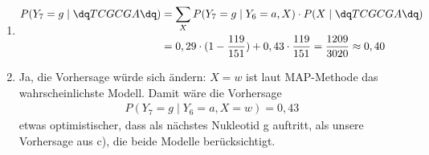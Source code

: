 \documentclass[a4paper,10pt]{article}
\begin{document}
\begin{enumerate}[~~a.)]
	 \item
	 \begin{align*}
	     P(Y_7 = g \mid \dq TCGCGA \dq) &= \sum_X P(Y_7 = g \mid Y_6 = a, X) \cdot  P(X \mid \dq TCGCGA \dq)\\
	     &= 0,29 \cdot (1-\frac{119}{151}) + 0,43 \cdot \frac{119}{151} = \frac{1209}{3020} \approx 0,40
	 \end{align*}
	 
	 \item
	 Ja, die Vorhersage würde sich ändern:
	 $X = w$ ist laut MAP-Methode das wahrscheinlichste Modell. Damit wäre die Vorhersage
	 \begin{align*}
	      P(Y_7 = g \mid Y_6 = a, X = w) = 0,43
	 \end{align*}
	 etwas optimistischer, dass als nächstes Nukleotid g auftritt, als unsere Vorhersage aus c), die beide Modelle berücksichtigt.
	\end{enumerate}
\end{document}
